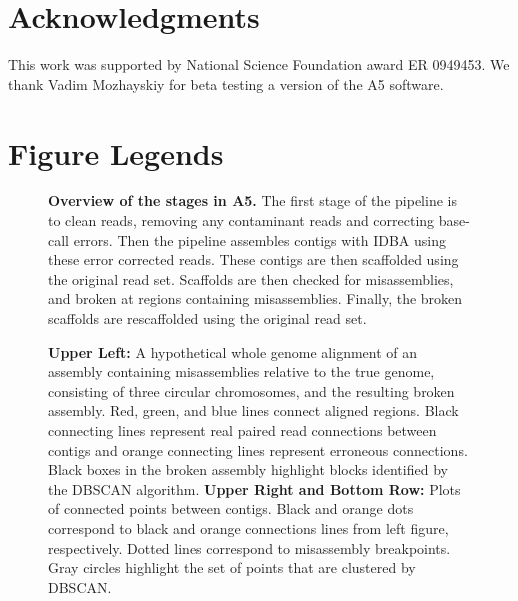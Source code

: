 \documentclass[10pt]{article}
\begin{document}
\section*{Acknowledgments}
This work was supported by National Science Foundation award ER 0949453. We thank Vadim Mozhayskiy for beta testing a
version of the A5 software.



\clearpage

\section*{Figure Legends}
\begin{figure}[hp]
\begin{center}
\end{center}
\caption{\textbf{Overview of the stages in A5.} The first stage of the pipeline is to clean reads, removing any contaminant
reads and correcting base-call errors. Then the pipeline assembles contigs with IDBA using these error corrected reads. These
contigs are then scaffolded using the original read set. Scaffolds are then checked for misassemblies, and broken at regions
containing misassemblies. Finally, the broken scaffolds are rescaffolded using the original read set.}
\label{fig:01}
\end{figure}

\begin{figure}[hp]
\caption{\textbf{Upper Left:}  A hypothetical whole genome alignment of an assembly containing misassemblies relative to the true genome,
consisting of three circular chromosomes, and the 
resulting broken assembly. Red, green, and blue lines connect aligned regions. Black connecting lines represent real paired read 
connections between contigs and orange connecting lines represent erroneous connections. Black boxes in the broken assembly highlight
blocks identified by the DBSCAN algorithm. \textbf{Upper Right and Bottom Row:} Plots of connected points between contigs. Black and orange dots 
correspond to black and orange connections lines from left figure, respectively. Dotted lines correspond
to misassembly breakpoints. Gray circles highlight the set of points that are clustered by DBSCAN. }
\label{fig:02}
\end{figure}
\end{document}
